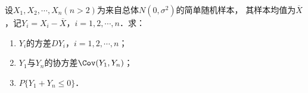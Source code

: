\documentclass[plain,noanswer,medmath]{../../template/jnuexam}
\begin{document}


\begin{problem}[points=13]
设$X_1,X_2, \cdots ,X_n(n > 2)$为来自总体$N(0,\sigma^2)$的简单随机样本，
其样本均值为$\overline{X}$，记$Y_i = X_i - \overline{X}$，$i = 1,2, \cdots ,n$．求：
\begin{enumerate}
\item $Y_i$的方差$DY_i$，$i = 1,2, \cdots ,n$；
\item $Y_1$与$Y_n$的协方差$\Cov (Y_1,Y_n)$；
\item $P\{Y_1 + Y_n \le 0\}$．
\end{enumerate}
\end{problem}
\end{document}

